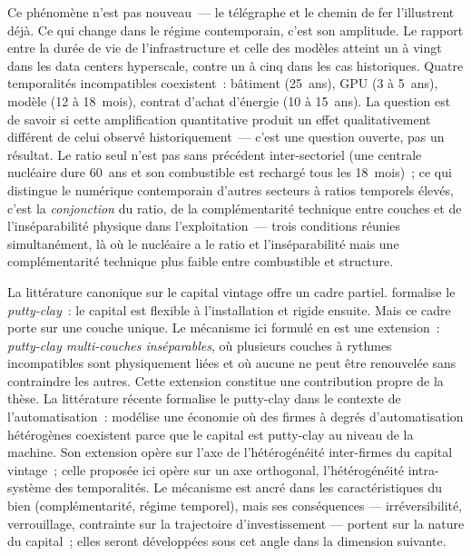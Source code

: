 Ce phénomène n'est pas nouveau~--- le télégraphe et le chemin de fer l'illustrent déjà. Ce qui change dans le régime contemporain, c'est son amplitude. Le rapport entre la durée de vie de l'infrastructure et celle des modèles atteint un à vingt dans les data centers hyperscale, contre un à cinq dans les cas historiques. Quatre temporalités incompatibles coexistent~: bâtiment (25~ans), GPU (3 à 5~ans), modèle (12 à 18~mois), contrat d'achat d'énergie (10 à 15~ans). La question est de savoir si cette amplification quantitative produit un effet qualitativement différent de celui observé historiquement~--- c'est une question ouverte, pas un résultat. Le ratio seul n'est pas sans précédent inter-sectoriel (une centrale nucléaire dure 60~ans et son combustible est rechargé tous les 18~mois)~; ce qui distingue le numérique contemporain d'autres secteurs à ratios temporels élevés, c'est la \emph{conjonction} du ratio, de la complémentarité technique entre couches et de l'inséparabilité physique dans l'exploitation~--- trois conditions réunies simultanément, là où le nucléaire a le ratio et l'inséparabilité mais une complémentarité technique plus faible entre combustible et structure.

La littérature canonique sur le capital vintage offre un cadre partiel. \textcite{johansen_substitution_1959} formalise le \emph{putty-clay}~: le capital est flexible à l'installation et rigide ensuite. Mais ce cadre porte sur une couche unique. Le mécanisme ici formulé en est une extension~: \emph{putty-clay multi-couches inséparables}, où plusieurs couches à rythmes incompatibles sont physiquement liées et où aucune ne peut être renouvelée sans contraindre les autres. Cette extension constitue une contribution propre de la thèse. La littérature récente formalise le putty-clay dans le contexte de l'automatisation~: \textcite{martinez_putty_2025} modélise une économie où des firmes à degrés d'automatisation hétérogènes coexistent parce que le capital est putty-clay au niveau de la machine. Son extension opère sur l'axe de l'hétérogénéité inter-firmes du capital vintage~; celle proposée ici opère sur un axe orthogonal, l'hétérogénéité intra-système des temporalités. Le mécanisme est ancré dans les caractéristiques du bien (complémentarité, régime temporel), mais ses conséquences --- irréversibilité, verrouillage, contrainte sur la trajectoire d'investissement --- portent sur la nature du capital~; elles seront développées sous cet angle dans la dimension suivante.

